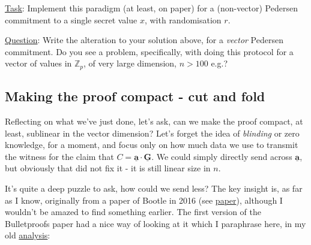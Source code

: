 \documentclass[10pt,a4paper]{article}
\begin{document}
\begin{framed}
\underline{Task}: Implement this paradigm (at least, on paper) for a (non-vector) Pedersen commitment to a single secret value $x$, with randomisation $r$.
\end{framed}

\vspace{5 pt}

\underline{Question}: Write the alteration to your solution above, for a \emph{vector} Pedersen commitment. Do you see a problem, specifically, with doing this protocol for a vector of values in $\mathbb{Z}_p$, of very large dimension, $n > 100$ e.g.?

\subsection{Making the proof compact - cut and fold}

Reflecting on what we've just done, let's ask, can we make the proof compact, at least, sublinear in the vector dimension? Let's forget the idea of \emph{blinding} or zero knowledge, for a moment, and focus only on how much data we use to transmit the witness for the claim that $C = \underline{\textbf{a}} \cdot \underline{\textbf{G}}$. We could simply directly send across $\underline{\textbf{a}}$, but obviously that did not fix it - it is still linear size in $n$.

\vspace{5 pt}

It's quite a deep puzzle to ask, how could we send less? The key insight is, as far as I know, originally from a paper of Bootle in 2016 (see \href{https://eprint.iacr.org/2016/263}{paper}), although I wouldn't be amazed to find something earlier. The first version of the Bulletproofs paper had a nice way of looking at it which I paraphrase here, in my old \href{https://github.com/AdamISZ/from0k2bp}{analysis}:
\end{document}
